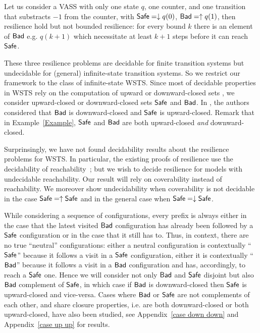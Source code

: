 \begin{example}
Let us consider a VASS with only one state $q$, one counter, and one transition that substracts $-1$ from the counter, with $\textsf{Safe} = \downarrow q(0)$, $\textsf{Bad} = \uparrow q(1)$,
then resilience hold but not bounded resilience: for every bound $k$ there is an element of $\textsf{Bad}$ e.g. $q(k+1)$ which necessitate at least $k+1$ steps before it can reach $\textsf{Safe}$. 
\end{example}



  
These three resilience problems are decidable for finite transition systems but undecidable for (general) infinite-state transition systems. So we restrict our framework to the class of infinite-state WSTS. Since most of decidable properties in WSTS rely on the computation of upward or downward-closed sets \cite{DBLP:journals/iandc/AbdullaCJT00, DBLP:journals/tcs/FinkelS01}, we consider upward-closed or downward-closed sets $\textsf{Safe}$ and $\textsf{Bad}$. In \cite{DBLP:journals/corr/abs-2108-00889}, the authors considered that $\textsf{Bad}$ is downward-closed and $\textsf{Safe}$ is upward-closed. %
Remark that in Example~\ref{Example}, $\textsf{Safe}$ and $\textsf{Bad}$ are both upward-closed \emph{and} downward-closed.

Surprinsingly, we have not found decidability results about the resilience problems for WSTS.	
In particular, the existing proofs of resilience use the decidability of reachability~\cite{DBLP:journals/corr/abs-2207-02697}; but we wish to decide resilience for models with undecidable reachability.
Our result will rely on coverability instead of reachability. We moreover show undecidability when coverability is not decidable in the case $\textsf{Safe} = \uparrow \textsf{Safe}$
and in the general case when $\textsf{Safe} = \downarrow \textsf{Safe}$.
 






While considering a sequence of configurations, every prefix is always 
either in the case that the latest visited $\textsf{Bad}$ configuration has already been followed by a $\textsf{Safe}$ configuration
or in the case that it still has to. 
Thus, in context, there are no true ``neutral'' configurations: either a neutral configuration is contextually ``$\textsf{Safe}$'' because it follows a visit in a $\textsf{Safe}$ configuration, either it is contextually ``$\textsf{Bad}$'' because it follows a visit in a $\textsf{Bad}$ configuration and has, accordingly, to reach a $\textsf{Safe}$ one.
Hence we will consider not only $\textsf{Bad}$ and $\textsf{Safe}$ disjoint but
	also
$\textsf{Bad}$ complement of $\textsf{Safe}$,
in which case
if $\textsf{Bad}$ is downward-closed then $\textsf{Safe}$ is upward-closed and vice-versa.
Cases where $\textsf{Bad}$ or $\textsf{Safe}$ are not complements of each other, and share closure properties, i.e. are both downward-closed or both upward-closed,
have also been studied, 
see 
Appendix~\ref{case down down}
and
Appendix~\ref{case up up} for results.

